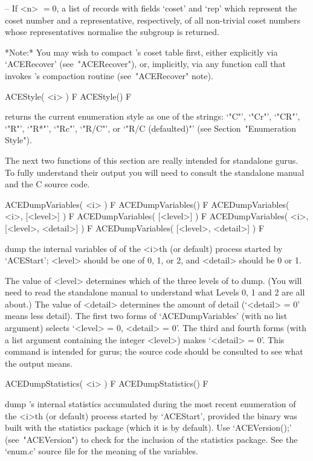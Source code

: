 \item{--} If <n> $= 0$, a list of  records  with  fields  `coset'  and
`rep'  which  represent  the  coset  number  and   a   representative,
respectively, of all non-trivial coset numbers  whose  representatives
normalise the subgroup is returned.

\endlist

*Note:*
You may wish to compact {\ACE}'s coset table first, either  explicitly
via `ACERecover' (see~"ACERecover"), or, implicitly, via any  function
call that invokes {\ACE}'s compaction routine (see~"ACERecover" note).

\>ACEStyle( <i> ) F
\>ACEStyle() F

returns the current enumeration style as one of  the  strings:  `"C"',
`"Cr"', `"CR"', `"R"', `"R*"', `"Rc"', `"R/C"', or `"R/C (defaulted)"'
(see Section~"Enumeration Style").

The next two functions of this section are really intended for  {\ACE}
standalone gurus. To fully understand their output you  will  need  to
consult the standalone manual and the C source code.

\>ACEDumpVariables( <i> ) F
\>ACEDumpVariables() F
\>ACEDumpVariables( <i>, [<level>] ) F
\>ACEDumpVariables( [<level>] ) F
\>ACEDumpVariables( <i>, [<level>, <detail>] ) F
\>ACEDumpVariables( [<level>, <detail>] ) F

dump the internal variables  of  {\ACE}  of  the  <i>th  (or  default)
process started by `ACEStart'; <level> should be one of 0,  1,  or  2,
and <detail> should be 0 or 1.

The value of <level> determines which of the three levels of {\ACE} to
dump. (You will need to read the standalone manual to understand  what
Levels 0, 1 and 2 are all about.) The value of <detail> determines the
amount of detail (`<detail> = 0' means less  detail).  The  first  two
forms of `ACEDumpVariables' (with no list argument) selects `<level> =
0, <detail> = 0'. The third and fourth forms  (with  a  list  argument
containing the integer <level>) makes `<detail> = 0'. This command  is
intended for gurus; the source code should be consulted  to  see  what
the output means.

\>ACEDumpStatistics( <i> ) F
\>ACEDumpStatistics() F

dump {\ACE}'s internal statistics accumulated during the  most  recent
enumeration of the <i>th (or default) process started  by  `ACEStart',
provided the {\ACE} binary  was  built  with  the  statistics  package
(which it is by default). Use  `ACEVersion();'  (see~"ACEVersion")  to
check for the inclusion of the statistics package.  See  the  `enum.c'
source file for the meaning of the variables.

